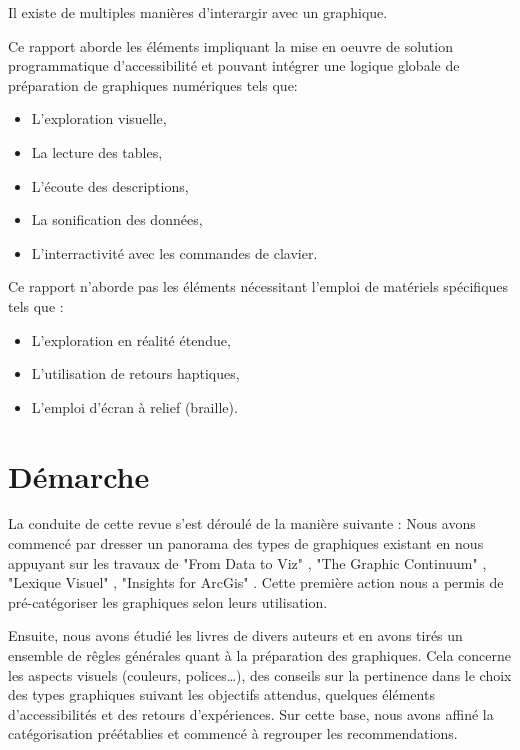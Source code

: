 \documentclass[a4paper,12pt]{article}
\begin{document}
\begin{multicols}{2}
Il existe de multiples manières d'interargir avec un graphique. \autocite{schwabishCenteringAccessibilityData2022a,frankelavskyRightToolsJob2022}

Ce rapport aborde les éléments impliquant la mise en oeuvre de solution programmatique d'accessibilité et pouvant intégrer une logique globale de préparation de graphiques numériques tels que:
\begin{itemize}
\item L'exploration visuelle,
\item La lecture des tables,
\item L'écoute des descriptions,
\item La sonification des données,
\item L'interractivité avec les commandes de clavier.
\end{itemize}

Ce rapport n'aborde pas les éléments nécessitant l'emploi de matériels spécifiques tels que :
\begin{itemize}
\item L'exploration en réalité étendue,
\item L'utilisation de retours haptiques,
\item L'emploi d'écran à relief (braille).
\end{itemize}
\section*{Démarche}
\label{sec:org41ddc4c}
La conduite de cette revue s'est déroulé de la manière suivante :
Nous avons commencé par dresser un panorama des types de graphiques existant en nous appuyant sur les travaux de "From Data to Viz" \autocite{yanholtzDataViz2018}, "The Graphic Continuum" \autocite{jonathanschwabishGraphicContinuum2014}, "Lexique Visuel" \autocite{alansmithLexiqueVisuel}, "Insights for ArcGis" \autocite{lindabealeInsightsArcGIS2017}.
Cette première action nous a permis de pré-catégoriser les graphiques selon leurs utilisation.

Ensuite, nous avons étudié les livres de divers auteurs et en avons tirés un ensemble de rêgles générales quant à la préparation des graphiques. Cela concerne les aspects visuels (couleurs, polices\ldots{}), des conseils sur la pertinence dans le choix des types graphiques suivant les objectifs attendus, quelques éléments d'accessibilités et des retours d'expériences. Sur cette base, nous avons affiné la catégorisation préétablies et commencé à regrouper les recommendations.


\end{multicols}
\end{document}
